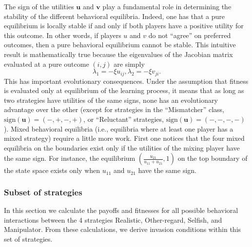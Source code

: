 \documentclass[11pt,reqno]{amsart}
\newcommand{\xr}{\xi} %
\newcommand{\pf}{u} %
\newcommand{\vpf}{\mathbf{u}} %
\newcommand{\pft}{v} %
\newcommand{\vpft}{\mathbf{v}} %
\newcommand{\eg}{\lambda} %
\newcommand{\sgn}{\textrm{sign}} %
\begin{document}
The sign of the utilities $\vpf$ and $\vpft$ play a fundamental role in determining the stability of the different behavioral equilibria. Indeed, one has that a pure equilibrium is locally stable if and only if both players have a positive utility for this outcome. In other words, if players $\pf$ and $\pft$ do not ``agree'' on preferred outcomes, then a pure behavioral equilibrium cannot be stable. This intuitive result is mathematically true because the eigenvalues of the Jacobian matrix evaluated at a pure outcome $(i,j)$ are simply
\begin{equation}
\eg_1 = -\xr \pf_{ij}, \eg_2 = -\xr \pft_{ji}.
\end{equation}
This has important evolutionary consequences. Under the assumption that fitness is evaluated only at equilibrium of the learning process, it means that as long as two strategies have utilities of the same signs, none has an evolutionary advantage over the other (except for strategies in the ``Mismatcher'' class, $\sgn(\vpf) = (-,+,-,+)$, or ``Reluctant'' strategies, $\sgn(\vpf) = (-,-,-,-)$).  
Mixed behavioral equilibria (i.e., equilibria where at least one player has a mixed strategy) require a little more work. First one notices that the four mixed equilibria on the boundaries exist only if the utilities of the mixing player have the same sign. For instance, the equilibrium $\left(\frac{\pf_{21}}{\pf_{11} + \pf_{21}},1\right)$ on the top boundary of the state space exists only when $\pf_{11}$ and $\pf_{21}$ have the same sign.








\subsubsection{Subset of strategies}


In this section we calculate the payoffs and fitnesses for all possible behavioral interactions between the 4 strategies Realistic, Other-regard, Selfish, and Manipulator. From these calculations, we derive invasion conditions within this set of strategies.
\end{document}
